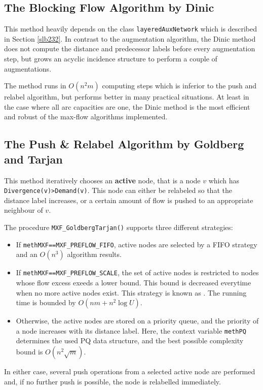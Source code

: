 \documentclass[a4paper,11pt,twoside]{book}
\begin{document}
\begin{multicols}{2}
\subsection{The Blocking Flow Algorithm by Dinic}
This method heavily depends on the class \verb/layeredAuxNetwork/ which is
described in Section \ref{slb232}. In contrast to the augmentation algorithm,
the Dinic method does not compute the distance and predecessor labels before
every augmentation step, but grows an acyclic incidence structure to perform a
couple of augmentations. 

The method runs in $O(n^2m)$ computing steps which is inferior to the push and
relabel algorithm, but performs better in many practical situations. At least
in the case where all arc capacities are one, the Dinic method is the most
efficient and robust of the max-flow algorithms implemented.


\subsection{The Push \& Relabel Algorithm by Goldberg and Tarjan}
This method iteratively chooses an {\bf active}
 node, that is a node $v$ which
has \verb/Divergence(v)>Demand(v)/. This node can either be relabeled so that
the distance label increases, or a certain amount of flow is pushed to an
appropriate neighbour of $v$.

The procedure \verb/MXF_GoldbergTarjan()/ supports three different strategies:
\begin{itemize}
\item If \verb/methMXF==MXF_PREFLOW_FIFO/, active nodes are selected by a FIFO strategy
    and an $O(n^3)$ algorithm results.
\item If \verb/methMXF==MXF_PREFLOW_SCALE/, the set of active nodes is restricted to nodes
    whose flow excess exeeds a lower bound. This bound is decreased everytime
    when no more active nodes exist. This strategy is known as
    . The running time is bounded by $O(nm+n^2\log{U})$.
\item Otherwise, the active nodes are stored on a priority queue, and the
    priority of a node increases with its distance label. Here, the context
    variable \verb/methPQ/ determines the used PQ data structure, and the best
    possible complexity bound is $O(n^2\sqrt{m})$.
\end{itemize}
In either case, several push operations from a selected active node are
performed and, if no further push is possible, the node is relabelled
immediately.


\end{multicols}
\end{document}
